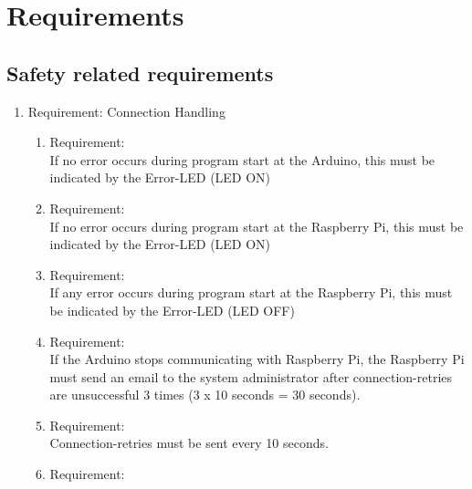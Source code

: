 \section{Requirements}
\label{chapter4}



\subsection{Safety related requirements}

	\begin{enumerate}[label*=\arabic*.]
		\item \label{req.1}  Requirement: Connection Handling \\
		\begin{enumerate}[label*=\arabic*.]
            \label{req.1.1}  Requirement:  \\
			If any error occurs during program start at the Arduino, this must be indicated by the Error-LED (LED OFF)\\ 
			\item \label{req.1.2} Requirement:   \\
			If no error occurs during program start at the Arduino, this must be indicated by the Error-LED (LED ON)\\ 
			\item \label{req.1.3} Requirement:   \\
			If no error occurs during program start at the Raspberry Pi, this must be indicated by the Error-LED (LED ON)\\    
			\item \label{req.1.4} Requirement:   \\
			If any error occurs during program start at the Raspberry Pi, this must be indicated by the Error-LED (LED OFF)\\     
			\item \label{req.1.5} Requirement:   \\
			If the Arduino stops communicating with Raspberry Pi, the Raspberry Pi must send an email to the system administrator after connection-retries are unsuccessful 3 times (3 x 10 seconds = 30 seconds).\\    
   		\item \label{req.1.6} Requirement:   \\
            Connection-retries must be sent every 10 seconds.\\
			\item \label{req.1.7} Requirement:   \\

\end{enumerate}
\end{enumerate}
